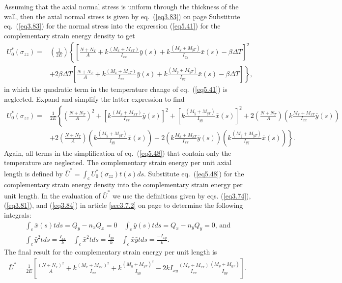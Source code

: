 \documentclass{AeroStructure-ERJohnson}
\begin{document}
Assuming that the axial normal stress is uniform through the thickness of the wall, then the axial normal stress is given by eq.~(\ref{eq3.83}) on page \pageref{eq3.83} Substitute eq.~(\ref{eq3.83}) for the normal stress into the expression (\ref{eq5.41}) for the complementary strain energy density to get
\begin{align*}
U_{0}^{*}\left(\sigma_{z z}\right)=&\left(\frac{1}{2 E}\right)\left\{\left[\frac{N+N_{T}}{A}+k \frac{\left(M_{x}+M_{x T}\right)}{I_{x x}} \bar{y}(s)+k \frac{\left(M_{y}+M_{y T}\right)}{I_{y y}} \bar{x}(s)-\beta \Delta T\right]^{2}\right.\\
&+\left.2 \beta \Delta T\left[\frac{N+N_{T}}{A}+k \frac{\left(M_{x}+M_{x T}\right)}{I_{x x}} \bar{y}(s)+k \frac{\left(M_{y}+M_{y T}\right)}{I_{y y}} \bar{x}(s)-\beta \Delta T\right]\right\},
\end{align*}
in which the quadratic term in the temperature change of eq.~(\ref{eq5.41}) is neglected. Expand and simplify the latter expression to find
\begin{align}\label{eq5.48}
U_{0}^{*}\left(\sigma_{z z}\right)=&\frac{1}{2 E}\left\{\left(\frac{N+N_{T}}{A}\right)^{2}+\left[k \frac{\left(M_{x}+M_{x T}\right)}{I_{x x}} \bar{y}(s)\right]^{2}+\left[k \frac{\left(M_{y}+M_{y T}\right)}{I_{y y}} \bar{x}(s)\right]^{2}+2\left(\frac{N+N_{T}}{A}\right)\left(k \frac{M_{x}+M_{x T}}{I_{x x}} \bar{y}(s)\right)\right. \nonumber\\
&+\left.2\left(\frac{N+N_{T}}{A}\right)\left(k \frac{\left(M_{y}+M_{y T}\right)}{I_{y y}} \bar{x}(s)\right)+2\left(k \frac{M_{x}+M_{x T}}{I_{x x}} \bar{y}(s)\right)\left(k \frac{\left(M_{y}+M_{y T}\right)}{I_{y y}} \bar{x}(s)\right)\right\}.
\end{align}
Again, all terms in the simplification of eq.~(\ref{eq5.48}) that contain only the temperature are neglected. The complementary strain energy per unit axial length is defined by $\bar{U}^{*}=\int_{c} U_{0}^{*}\left(\sigma_{z z}\right) t(s) d s$. Substitute eq.~(\ref{eq5.48}) for the complementary strain energy density into the complementary strain energy per unit length. In the evaluation of $\bar{U}^{*}$ we use the definitions given by eqs. (\ref{eq3.74}), (\ref{eq3.81}), and (\ref{eq3.84}) in article \ref{sec3.7.2} on page \pageref{sec3.7.2} to determine the following integrals:
\begin{gather}
\int_{c} \bar{x}(s) t d s=Q_{y}-n_{x} Q_{x}=0 \quad \int_{c} \bar{y}(s) t d s=Q_{x}-n_{y} Q_{y}=0\mbox{, and}\label{eq5.49}\\
\int_{c} \bar{y}^{2} t d s=\frac{I_{x x}}{k} \quad \int_{c} \bar{x}^{2} t d s=\frac{I_{y y}}{k} \quad \int_{c} \bar{x} \bar{y} t d s=\frac{-I_{x y}}{k}.\label{eq5.50}
\end{gather}
The final result for the complementary strain energy per unit length is
\begin{align}\label{eq5.51}
\bar{U}^{*}=\frac{1}{2 E}\left[\frac{\left(N+N_{T}\right)^{2}}{A}+k \frac{\left(M_{x}+M_{x T}\right)^{2}}{I_{x x}}+k \frac{\left(M_{y}+M_{y T}\right)^{2}}{I_{y y}}-2 k I_{x y} \frac{\left(M_{x}+M_{x T}\right)}{I_{x x}} \frac{\left(M_{y}+M_{y T}\right)}{I_{y y}}\right].
\end{align}
\end{document}
